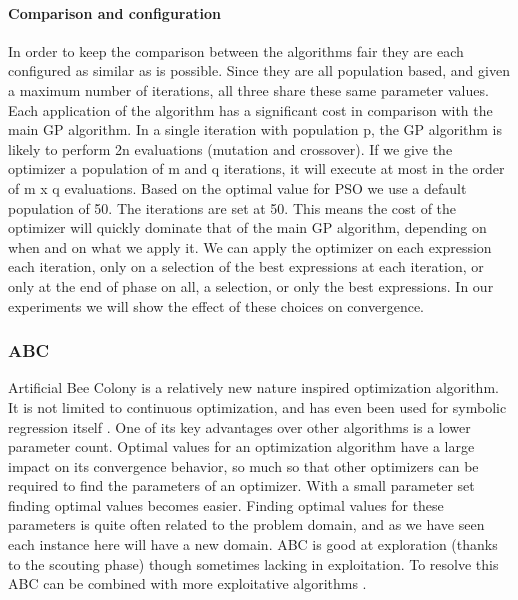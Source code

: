 \paragraph{Comparison and configuration}
In order to keep the comparison between the algorithms fair they are each configured as similar as is possible. Since they are all population based, and given a maximum number of iterations, all three share these same parameter values. Each application of the algorithm has a significant cost in comparison with the main GP algorithm. In a single iteration with population p, the GP algorithm is likely to perform 2n evaluations (mutation and crossover). If we give the optimizer a population of m and q iterations, it will execute at most in the order of  m x q evaluations. Based on the optimal value for PSO \cite{PSO} we use a default population of 50. The iterations are set at 50. This means the cost of the optimizer will quickly dominate that of the main GP algorithm, depending on when and on what we apply it. We can apply the optimizer on each expression each iteration, only on a selection of the best expressions at each iteration, or only at the end of phase on all, a selection, or only the best expressions. In our experiments we will show the effect of these choices on convergence.

\subsubsection{ABC}
Artificial Bee Colony \citep{ABC} is a relatively new nature inspired optimization algorithm. It is not limited to continuous optimization, and has even been used for symbolic regression itself \cite{ABCSR}. One of its key advantages over other algorithms is a lower parameter count. Optimal values for an optimization algorithm have a large impact on its convergence behavior, so much so that other optimizers can be required to find the parameters of an optimizer. With a small parameter set finding optimal values becomes easier. Finding optimal values for these parameters is quite often related to the problem domain, and as we have seen each instance here will have a new domain. ABC is good at exploration (thanks to the scouting phase) though sometimes lacking in exploitation. To resolve this ABC can be combined with more exploitative algorithms \citep{ABCPSO}.


